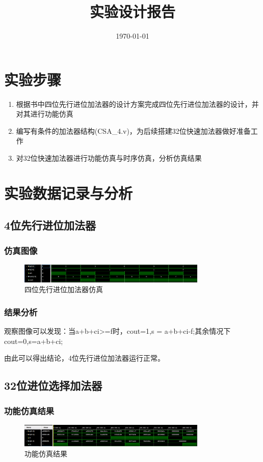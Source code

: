 \documentclass{../source/zjureport}
\title{实验设计报告}
\date{\today}
\begin{document}
    \makecover
    \makeheader

    \section{实验步骤}
    \begin{enumerate}
        \item 根据书中四位先行进位加法器的设计方案完成四位先行进位加法器的设计，并对其进行功能仿真
        \item 编写有条件的加法器结构(CSA_4.v)，为后续搭建32位快速加法器做好准备工作
        \item 对32位快速加法器进行功能仿真与时序仿真，分析仿真结果
    \end{enumerate}

    \section{实验数据记录与分析}
        \subsection{4位先行进位加法器}
            \subsubsection{仿真图像}
                \begin{figure}[!htp]
                    \centering
                    \includegraphics[width = 0.8\textwidth]{figure/adder_4bits.png}
                    \caption{四位先行进位加法器仿真}
                \end{figure}
            \subsubsection{结果分析}
            观察图像可以发现：当a+b+ci>=f时，cout=1,s = a+b+ci-f;其余情况下cout=0,s=a+b+ci;

            由此可以得出结论，4位先行进位加法器运行正常。
        \subsection{32位进位选择加法器}
            \subsubsection{功能仿真结果}
                \begin{figure}[!htp]
                    \centering
                    \includegraphics[width = 0.8\textwidth]{figure/behaviorSimulation1.png}
                    \caption{功能仿真结果}
                \end{figure}
\end{document}
